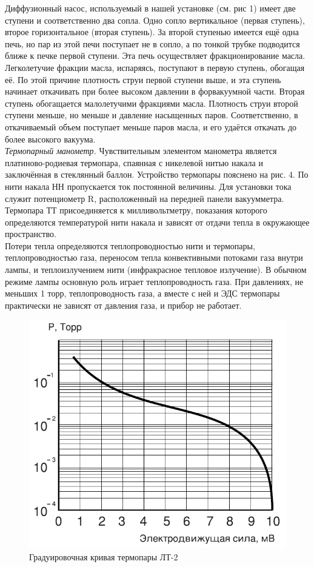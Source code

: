 \documentclass[a4paper, 12pt]{article}
\begin{document}
Диффузионный насос, используемый в нашей установке (см. рис 1) имеет две ступени и соответственно два сопла. Одно сопло вертикальное (первая ступень), второе горизонтальное (вторая ступень). За второй ступенью имеется ещё одна печь, но пар из этой печи поступает не в сопло, а по тонкой трубке подводится ближе к печке первой ступени.
Эта печь осуществляет фракционирование масла. Легколетучие фракции масла, испаряясь, поступают в первую ступень, обогащая её. По этой причине плотность струи первой ступени выше, и эта ступень начинает откачивать при более высоком давлении в форвакуумной части. Вторая ступень обогащается малолетучими фракциями масла. Плотность струи второй ступени меньше, но меньше и давление насыщенных паров. Соответственно, в откачиваемый объем поступает меньше паров масла, и его удаётся откачать до более высокого вакуума.  \\
 
 \textit{Термопарный манометр.} Чувствительным элементом манометра является платиново-родиевая термопара, спаянная с никелевой нитью накала и заключённая в стеклянный баллон. Устройство термопары пояснено на рис. 4. По нити накала НН пропускается ток постоянной величины. Для установки тока служит потенциометр R, расположенный на передней панели вакуумметра. Термопара ТТ присоединяется к милливольтметру, показания которого определяются температурой нити накала и зависят от отдачи тепла в окружающее пространство. \\
 
 Потери тепла определяются теплопроводностью нити и термопары, теплопроводностью газа, переносом тепла конвективными потоками газа внутри лампы, и теплоизлучением нити (инфракрасное тепловое излучение). В обычном режиме лампы основную роль играет теплопроводность газа. При давлениях, не меньших 1 торр, теплопроводность газа, а вместе с ней и ЭДС термопары практически не зависят от давления газа, и прибор не работает. \\

 \begin{figure}[!h]
 	\centering
 	\includegraphics[width=0.5\linewidth]{7.png}
 	\caption[]{Градуировочная кривая термопары ЛТ-2}
 	\label{fig:Градуировочная кривая}
 \end{figure}
\end{document}
